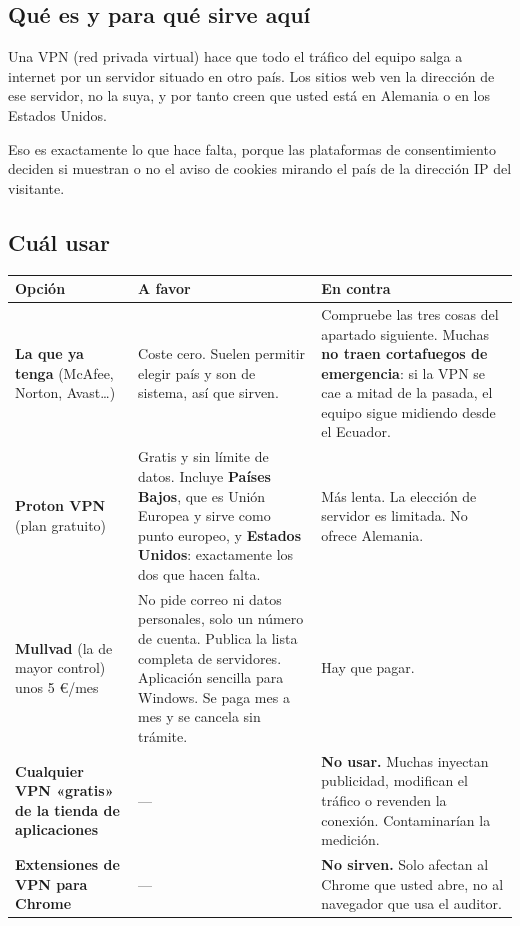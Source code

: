 \documentclass[11pt,a4paper]{article}
\begin{document}
\subsection{Qué es y para qué sirve aquí}

Una VPN (red privada virtual) hace que todo el tráfico del equipo salga a internet por un servidor situado en otro país. Los sitios web ven la dirección de ese servidor, no la suya, y por tanto creen que usted está en Alemania o en los Estados Unidos.

Eso es exactamente lo que hace falta, porque las plataformas de consentimiento deciden si muestran o no el aviso de cookies mirando el país de la dirección IP del visitante.

\subsection{Cuál usar}

\begin{longtable}{@{}>{\RaggedRight}p{3.0cm}>{\RaggedRight}p{5.6cm}>{\RaggedRight\arraybackslash}p{5.6cm}@{}}
	\toprule
	\textbf{Opción} & \textbf{A favor} & \textbf{En contra} \\
	\midrule
	\endhead
	\textbf{La que ya tenga} \newline (McAfee, Norton, Avast\ldots) & Coste cero. Suelen permitir elegir país y son de sistema, así que sirven. & Compruebe las tres cosas del apartado siguiente. Muchas \textbf{no traen cortafuegos de emergencia}: si la VPN se cae a mitad de la pasada, el equipo sigue midiendo desde el Ecuador. \\
	\addlinespace
	\textbf{Proton VPN} \newline (plan gratuito) & Gratis y sin límite de datos. Incluye \textbf{Países Bajos}, que es Unión Europea y sirve como punto europeo, y \textbf{Estados Unidos}: exactamente los dos que hacen falta. & Más lenta. La elección de servidor es limitada. No ofrece Alemania. \\
	\addlinespace
	\textbf{Mullvad} \newline (la de mayor control) \newline unos 5 €/mes & No pide correo ni datos personales, solo un número de cuenta. Publica la lista completa de servidores. Aplicación sencilla para Windows. Se paga mes a mes y se cancela sin trámite. & Hay que pagar. \\
	\addlinespace
	\textbf{Cualquier VPN «gratis» de la tienda de aplicaciones} & --- & \textbf{No usar.} Muchas inyectan publicidad, modifican el tráfico o revenden la conexión. Contaminarían la medición. \\
	\addlinespace
	\textbf{Extensiones de VPN para Chrome} & --- & \textbf{No sirven.} Solo afectan al Chrome que usted abre, no al navegador que usa el auditor. \\
	\bottomrule
\end{longtable}
\end{document}
